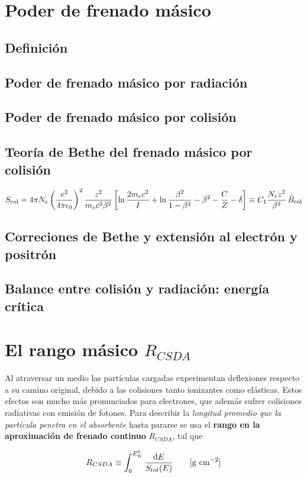 \section{Poder de frenado másico}



\subsection{Definición}

\subsection{Poder de frenado másico por radiación}


\subsection{Poder de frenado másico por colisión}


\subsection{Teoría de Bethe del frenado másico por colisión}

\begin{equation}
S_\text{\text{col}} = 4\pi N_e \left( \frac{e^2}{4\pi \epsilon_0} \right)^2 
        \frac{z^2}{m_e c^2 \beta^2} 
        \left[ \ln \frac{2 m_e c^2}{I} + \ln \frac{\beta^2}{1 - \beta^2} - \beta^2 - \frac{C}{Z} - \delta \right]
        \equiv C_1 \frac{N_e z^2}{\beta^2} \, \bar{B}_\text{\text{col}}
\end{equation}

\subsection{Correciones de Bethe y extensión al electrón y positrón}

\subsection{Balance entre colisión y radiación: energía crítica}


\section{El rango másico $R_{CSDA}$}

Al atraversar un medio las partículas cargadas experimentan deflexiones respecto a su camino original, debido a las colisiones tanto ionizantes como elásticas. Estos efectos son mucho más pronunciados para electrones, que además sufrer colisiones radiativas con emisión de fotones. Para describir la \textit{longitud promedio que la partícula penetra en el absorbente} hasta pararse se usa el \textbf{rango en la aproximación de frenado continuo} $R_{CSDA}$, tal que 

\begin{equation}
    R_{CSDA} \equiv \int_{0}^{E_K^0} \frac{\D E }{S_{tot}(E) } \qquad [\unit{g \ cm^{-2}}]
\end{equation}